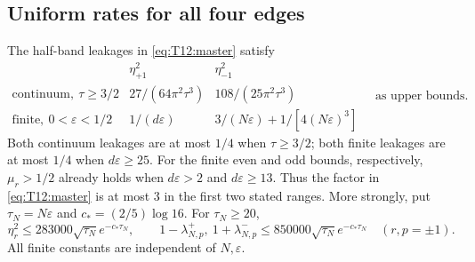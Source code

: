 \subsection{Uniform rates for all four edges}\label{sec:T12:edges}
\begin{theorem}\label{thm:T12:cont}
\label{thm:T12:disc}\label{thm:rev:uniform:discrete}
The half-band leakages in \eqref{eq:T12:master} satisfy
\begin{equation}\label{eq:T12:thresh}
\begin{array}{c|cc}
 &\eta_{+1}^2&\eta_{-1}^2\\ \hline
\text{continuum},\ \tau\ge3/2&
27/(64\pi^2\tau^3)&108/(25\pi^2\tau^3)\\
\text{finite},\ 0<\varepsilon<1/2&
1/(d\varepsilon)&3/(N\varepsilon)+1/[4(N\varepsilon)^3]
\end{array}
\quad\text{as upper bounds.}
\end{equation}
Both continuum leakages are at most $1/4$ when $\tau\ge3/2$;
both finite leakages are at most $1/4$ when $d\varepsilon\ge25$.
For the finite even and odd bounds, respectively, $\mu_r>1/2$
already holds when $d\varepsilon>2$ and $d\varepsilon\ge13$.
Thus the factor in \eqref{eq:T12:master} is at most $3$ in the
first two stated ranges. More strongly, put
$\tau_N=N\varepsilon$ and $c_*=(2/5)\log16$. For $\tau_N\ge20$,
\begin{equation}\label{eq:rev:uniform:edges}
 \eta_r^2\le283000\sqrt{\tau_N}e^{-c_*\tau_N},\qquad
 1-\lambda_{N,p}^+,\ 1+\lambda_{N,p}^-
 \le850000\sqrt{\tau_N}e^{-c_*\tau_N}
 \quad(r,p=\pm1).
\end{equation}
All finite constants are independent of $N,\varepsilon$.
\end{theorem}

